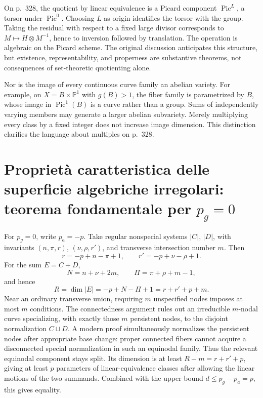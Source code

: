 On p.~328, the quotient by linear equivalence is a Picard component \(\operatorname{Pic}^L\), a torsor under \(\operatorname{Pic}^0\). Choosing \(L\) as origin identifies the torsor with the group. Taking the residual with respect to a fixed large divisor corresponds to \(M\mapsto H\otimes M^{-1}\), hence to inversion followed by translation. The operation is algebraic on the Picard scheme. The original discussion anticipates this structure, but existence, representability, and properness are substantive theorems, not consequences of set-theoretic quotienting alone.

Nor is the image of every continuous curve family an abelian variety. For example, on \(X=B\times\mathbb P^1\) with \(g(B)>1\), the fiber family is parametrized by \(B\), whose image in \(\operatorname{Pic}^1(B)\) is a curve rather than a group. Sums of independently varying members may generate a larger abelian subvariety. Merely multiplying every class by a fixed integer does not increase image dimension. This distinction clarifies the language about multiples on p.~328.



\section{Proprietà caratteristica delle superficie algebriche irregolari: teorema fondamentale per \texorpdfstring{\(p_g=0\)}{pg = 0}}\label{cp2-ix-4}

For \(p_g=0\), write \(p_a=-p\). Take regular nonspecial systems \(\vert C\vert \), \(\vert D\vert \), with invariants \((n,\pi,r)\), \((\nu,\rho,r')\), and transverse intersection number \(m\). Then
\[
r=-p+n-\pi+1,\qquad r'=-p+\nu-\rho+1.
\]
For the sum \(E=C+D\),
\[
N=n+\nu+2m,\qquad
\Pi=\pi+\rho+m-1,
\]
and hence
\begin{equation*}\label{cp2-ix-eq5}
R=\dim\vert E\vert =-p+N-\Pi+1=r+r'+p+m.
\tag{IX.5}
\end{equation*}
Near an ordinary transverse union, requiring \(m\) unspecified nodes imposes at most \(m\) conditions. The connectedness argument rules out an irreducible \(m\)-nodal curve specializing, with exactly those \(m\) persistent nodes, to the disjoint normalization \(C\sqcup D\). A modern proof simultaneously normalizes the persistent nodes after appropriate base change: proper connected fibers cannot acquire a disconnected special normalization in such an equinodal family. Thus the relevant equinodal component stays split. Its dimension is at least \(R-m=r+r'+p\), giving at least \(p\) parameters of linear-equivalence classes after allowing the linear motions of the two summands. Combined with the upper bound \(d\leq p_g-p_a=p\), this gives equality.

